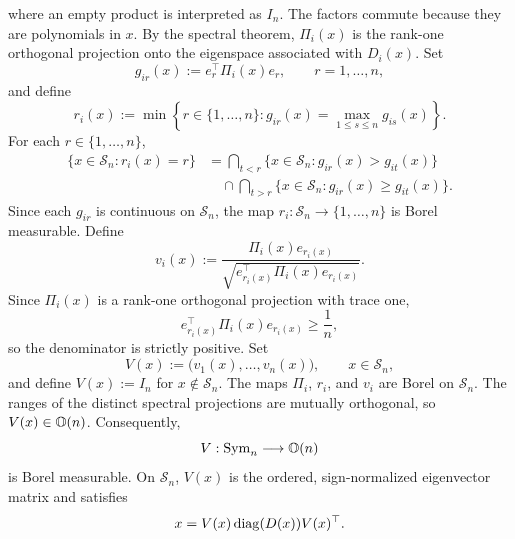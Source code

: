 where an empty product is interpreted as \(I_n\). The factors commute
because they are polynomials in \(x\). By the spectral theorem,
\(\Pi_i(x)\) is the rank-one orthogonal projection onto the eigenspace
associated with \(D_i(x)\).
Set
\[
g_{ir}(x)
:=
e_r^\top\Pi_i(x)e_r,
\qquad r=1,\ldots,n,
\]
and define
\[
r_i(x)
:=
\min\left\{
r\in\{1,\ldots,n\}:
g_{ir}(x)=\max_{1\leq s\leq n}g_{is}(x)
\right\}.
\]
For each \(r\in\{1,\ldots,n\}\),
\[
\begin{aligned}
\{x\in\mathcal S_n:r_i(x)=r\}
&=
\bigcap_{t<r}
\{x\in\mathcal S_n:g_{ir}(x)>g_{it}(x)\} \\
&\quad\cap
\bigcap_{t>r}
\{x\in\mathcal S_n:g_{ir}(x)\geq g_{it}(x)\}.
\end{aligned}
\]
Since each \(g_{ir}\) is continuous on \(\mathcal S_n\), the map
\(r_i:\mathcal S_n\to\{1,\ldots,n\}\) is Borel measurable.
Define
\[
v_i(x)
:=
\frac{\Pi_i(x)e_{r_i(x)}}
{\sqrt{
e_{r_i(x)}^\top\Pi_i(x)e_{r_i(x)}
}}.
\]
Since \(\Pi_i(x)\) is a rank-one orthogonal projection with trace one,
\[
e_{r_i(x)}^\top\Pi_i(x)e_{r_i(x)}
\geq\frac1n,
\]
so the denominator is strictly positive. Set
\[
V(x)
:=
\bigl(v_1(x),\ldots,v_n(x)\bigr),
\qquad x\in\mathcal S_n,
\]
and define \(V(x):=I_n\) for \(x\notin\mathcal S_n\).
The maps \(\Pi_i\), \(r_i\), and \(v_i\) are Borel on
\(\mathcal S_n\). The ranges of the distinct spectral projections are
mutually orthogonal, so \(V(x)\in\mathbb{O}(n)\). Consequently,
\[
V:\mathrm{Sym}_n\longrightarrow\mathbb{O}(n)
\]
is Borel measurable. On \(\mathcal S_n\), \(V(x)\) is the ordered,
sign-normalized eigenvector matrix and satisfies
\[
x
=
V(x)\operatorname{diag}(D(x))V(x)^\top.
\]

